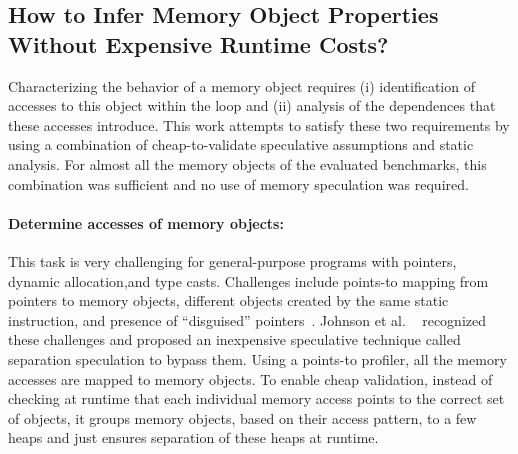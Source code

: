 

\subsection{How to Infer Memory Object Properties \\ Without Expensive Runtime
Costs?}

Characterizing the behavior of a memory object requires (i) identification of
accesses to this object within the loop and (ii) analysis of the dependences
that these accesses introduce.  This work attempts to satisfy these two
requirements by using a combination of cheap-to-validate speculative assumptions
and static analysis. For almost all the memory objects of the evaluated
benchmarks, this combination was sufficient and no use of memory speculation was
required.

\paragraph{Determine accesses of memory objects:} This task is very challenging
for general-purpose programs with pointers, dynamic allocation,and type casts.
%
Challenges include points-to mapping from pointers to memory objects, different
objects created by the same static instruction, and presence of ``disguised''
pointers~\cite{citation3_from_privateer}.
%
Johnson et al. ~\cite{johnson:pldi:12} recognized these challenges and proposed
an inexpensive speculative technique called separation speculation to bypass
them.
%
Using a points-to profiler, all the memory accesses are mapped to memory
objects.
%
To enable cheap validation, instead of checking at runtime that each individual
memory access points to the correct set of objects, it groups memory objects,
based on their access pattern, to a few heaps and just ensures separation of
these heaps at runtime.
%

